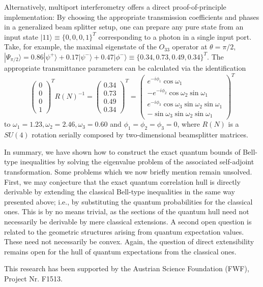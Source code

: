 \documentclass[prl,showpacs,showkeys,amsfonts,amsmath,twocolumn]{revtex4}
\newcommand{\ket}[1]{|#1\rangle}
\begin{document}
Alternatively, multiport interferometry \cite{rzbb,zukowski-97,svozil-2004-analog}
offers a direct proof-of-principle
implementation:
By choosing the appropriate transmission coefficients and phases in a generalized
beam splitter setup, one can prepare any pure state
from an input state $\ket{11} \equiv \{0,0,0,1\}^T$ corresponding to a photon
in a single input port. Take, for example, the maximal eigenstate of
the $O_{33}$ operator at $\theta=\pi/2$, $\ket{\Psi_{\pi/2}}= 0.86
  \ket{\psi^+} + 0.17\ket{\psi^-} + 0.47\ket{\phi^-} \equiv
  \{0.34,0.73,0.49,0.34\}^T$. The appropriate transmittance parameters
  can be calculated via the identification \cite{rzbb}
  \begin{equation}
    \begin{pmatrix}0\\0\\0\\1\end{pmatrix}^T R(N)^{-1} =  \begin{pmatrix}0.34\\0.73\\0.49\\0.34\end{pmatrix}^T =
    \begin{pmatrix}e^{-i\phi_1}\cos\omega_1 \\-e^{-i\phi_2}\cos\omega_2\sin\omega_1\\e^{-i\phi_3}\cos\omega_3\sin\omega_2\sin\omega_1\\-\sin\omega_3\sin\omega_2\sin\omega_1\end{pmatrix}^T
  \end{equation}
to $\omega_1 = 1.23, \omega_2=2.46,\omega_3=0.60$ and $\phi_1=\phi_2=\phi_3=0$,
where $R(N)$ is a
$SU(4)$ rotation serially composed by two-dimensional beamsplitter
matrices.


In summary, we have shown how to construct the exact quantum bounds of
Bell-type inequalities
by solving the eigenvalue problem of the associated self-adjoint
transformation.
Some problems which we now briefly mention remain unsolved. First, we may conjecture that the exact quantum correlation hull is directly derivable by extending the
classical Bell-type
inequalities in the same way presented above;
i.e., by substituting the quantum probabilities for the classical ones. This is by no means trivial, as the sections of the quantum hull need not necessarily be derivable by mere classical extensions. A second open question is related to the geometric structures arising from quantum expectation values. These need not necessarily be convex. Again, the question of direct extensibility remains open for the hull of
quantum expectations
from the classical ones.

This research has been supported by the Austrian Science Foundation (FWF),
Project Nr. F1513.




\end{document}

